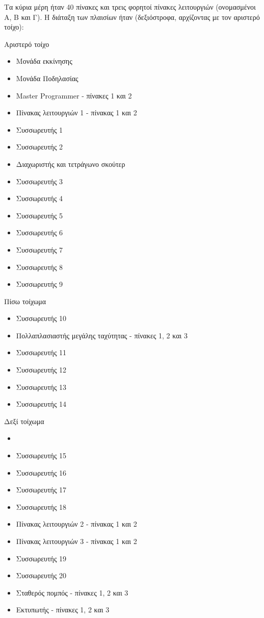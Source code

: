 \documentclass[11pt,a4paper,notitlepage,fleqn]{article}
\begin{document}
Τα κύρια μέρη ήταν 40 πίνακες και τρεις φορητοί πίνακες λειτουργιών (ονομασμένοι Α, Β και Γ). Η διάταξη των πλαισίων ήταν (δεξιόστροφα, αρχίζοντας με τον αριστερό τοίχο):

Αριστερό τοίχο

\begin{itemize}
	\item     Μονάδα εκκίνησης
	\item     Μονάδα Ποδηλασίας
	\item     Master Programmer - πίνακες 1 και 2
	\item     Πίνακας λειτουργιών 1 - πίνακας 1 και 2
	\item     Συσσωρευτής 1
	\item     Συσσωρευτής 2
	\item     Διαχωριστής και τετράγωνο σκούτερ
	\item     Συσσωρευτής 3
	\item     Συσσωρευτής 4
	\item     Συσσωρευτής 5
	\item     Συσσωρευτής 6
	\item     Συσσωρευτής 7
	\item     Συσσωρευτής 8
	\item     Συσσωρευτής 9
\end{itemize}


Πίσω τοίχωμα

\begin{itemize}
	\item     Συσσωρευτής 10
	\item     Πολλαπλασιαστής μεγάλης ταχύτητας - πίνακες 1, 2 και 3
	\item     Συσσωρευτής 11
	\item     Συσσωρευτής 12
	\item     Συσσωρευτής 13
	\item     Συσσωρευτής 14
\end{itemize}


Δεξί τοίχωμα
\begin{itemize}
	\item 
	\item     Συσσωρευτής 15
	\item     Συσσωρευτής 16
	\item     Συσσωρευτής 17
	\item     Συσσωρευτής 18
	\item     Πίνακας λειτουργιών 2 - πίνακας 1 και 2
	\item     Πίνακας λειτουργιών 3 - πίνακας 1 και 2
	\item     Συσσωρευτής 19
	\item     Συσσωρευτής 20
	\item     Σταθερός πομπός - πίνακες 1, 2 και 3
	\item     Εκτυπωτής - πίνακες 1, 2 και 3
\end{itemize}
\end{document}
